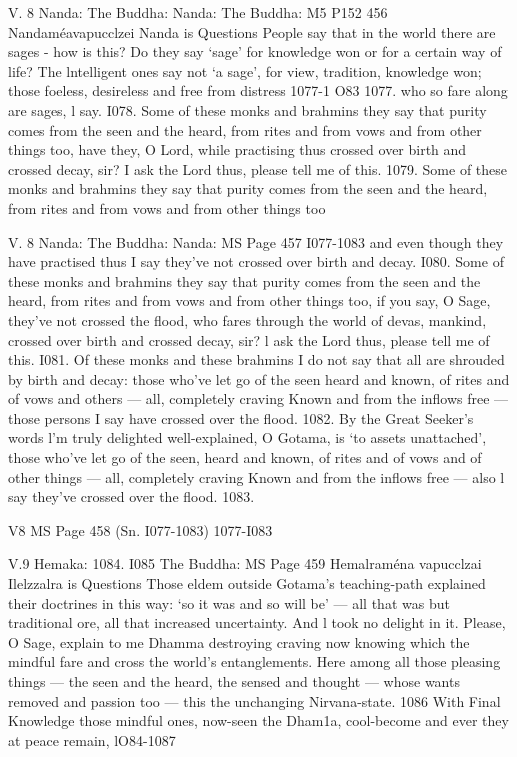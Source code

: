    
   
   V. 8
   Nanda:
   The Buddha:
   Nanda:
   The Buddha:
   M5 P152 456
   Nandaméavapucclzei
   Nanda is Questions
   People say that in the world
   there are sages - how is this?
   Do they say `sage' for knowledge won
   or for a certain way of life?
   The lntelligent ones say not `a sage',
   for view, tradition, knowledge won;
   those foeless, desireless and free from distress
   1077-1 O83
   1077.
   who so fare along are sages, l say. I078.
   Some of these monks and brahmins they say
   that purity comes from the seen and the heard,
   from rites and from vows and from other things too,
   have they, O Lord, while practising thus
   crossed over birth and crossed decay, sir?
   I ask the Lord thus, please tell me of this. 1079.
   Some of these monks and brahmins they say
   that purity comes from the seen and the heard,
   from rites and from vows and from other things too
   
   
   
   V. 8
   Nanda:
   The Buddha:
   Nanda:
   MS Page 457
   I077-1083
   and even though they have practised thus
   I say they've not crossed over birth and decay. I080.
   Some of these monks and brahmins they say
   that purity comes from the seen and the heard,
   from rites and from vows and from other things too,
   if you say, O Sage, they've not crossed the ﬂood,
   who fares through the world of devas, mankind,
   crossed over birth and crossed decay, sir?
   l ask the Lord thus, please tell me of this. I081.
   Of these monks and these brahmins I do not say
   that all are shrouded by birth and decay:
   those who've let go of the seen heard and known,
   of rites and of vows and others — all,
   completely craving Known and from the inﬂows free —
   those persons I say have crossed over the ﬂood. 1082.
   By the Great Seeker's words l'm truly delighted
   well-explained, O Gotama, is `to assets unattached',
   those who've let go of the seen, heard and known,
   of rites and of vows and of other things — all,
   completely craving Known and from the inﬂows free —
   also l say they've crossed over the ﬂood. 1083.
   
   
   
   V8
   MS Page 458
   (Sn. I077-1083)
   1077-I083
   
   
   
   V.9
   Hemaka:
   1084.
   I085
   The Buddha:
   MS Page 459
   Hemalraména vapucclzai
   Ilelzzalra is Questions
   Those eldem outside Gotama's teaching-path
   explained their doctrines in this way:
   `so it was and so will be' —
   all that was but traditional ore,
   all that increased uncertainty.
   And l took no delight in it.
   Please, O Sage, explain to me
   Dhamma destroying craving now
   knowing which the mindful fare
   and cross the world's entanglements.
   Here among all those pleasing things —
   the seen and the heard, the sensed and thought —
   whose wants removed and passion too —
   this the unchanging Nirvana-state. 1086
   With Final Knowledge those mindful ones,
   now-seen the Dham1a, cool-become
   and ever they at peace remain,
   lO84-1087
   
